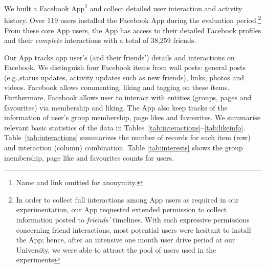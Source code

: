 

We built a Facebook App\footnote{Name and link omitted
for anonymity.} and  collect detailed user interaction and activity history. 
Over 119 users installed the Facebook App during the evaluation
period.\footnote{In order to collect full interactions among App users
as required in our experimentation, our App requested extended permission to collect
information posted to \emph{friends'} timelines.  With such expressive
permissions concerning friend interactions, most potential users were
hesitant to install the App; hence, after an intensive one month user drive period
at our University, we were able to attract the pool of users used in the experiments}
From these core App users, the App has access to their detailed
Facebook profiles and their \emph{complete} interactions with a total of 38,259
friends.

Our App tracks app user's (and their friends') details and
interactions on Facebook. We distinguish four Facebook items from wall posts:
general posts (e.g.,status updates, activity updates such as new friends), 
links, photos and videos. Facebook allows commenting, liking and tagging on these items.
Furthermore, Facebook allows user to interact with entities
(groups, pages and favourites) via membership and liking. The App also
keep tracks of the information of user's group membership, page likes
and favourites. We summarise relevant basic statistics of the data in
Tables~\ref{tab:interactions}--\ref{tab:likeinfo}.
Table~\ref{tab:interactions} summarizes the number of records for each
item (row) and interaction (column)
combination. Table \ref{tab:interests} shows the group membership,
page like and favourites counts for users.



